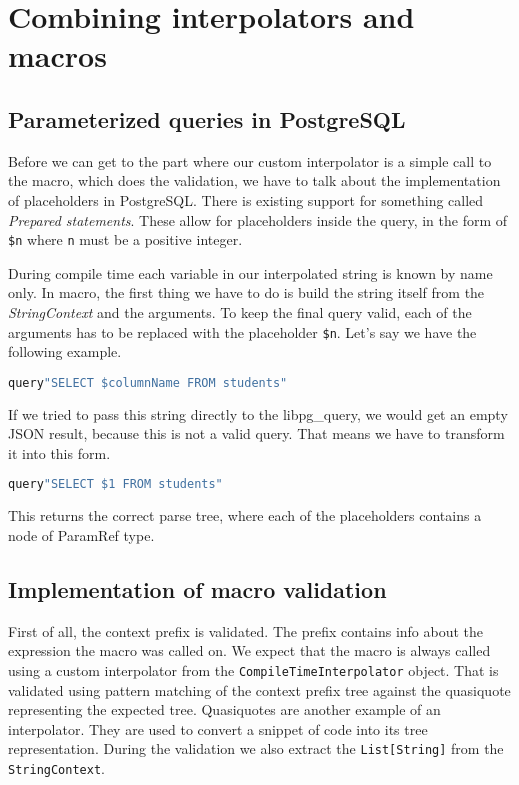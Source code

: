 \section{Combining interpolators and macros}
\subsection{Parameterized queries in PostgreSQL}
Before we can get to the part where our custom interpolator is a simple call to the macro, which does the validation, we have to talk about the implementation of placeholders in PostgreSQL. There is existing support for something called \textit{Prepared statements}. These allow for placeholders inside the query, in the form of \texttt{\$n} where \texttt{n} must be a positive integer.  

During compile time each variable in our interpolated string is known by name only. In macro, the first thing we have to do is build the string itself from the \textit{StringContext} and the arguments. To keep the final query valid, each of the arguments has to be replaced with the placeholder \texttt{\$n}. 
Let's say we have the following example.
\begin{lstlisting}[language=scala, basicstyle=\ttfamily, showstringspaces=false]
query"SELECT $columnName FROM students"
\end{lstlisting}
If we tried to pass this string directly to the libpg\_query, we would get an empty JSON result, because this is not a valid query. That means we have to transform it into this form.
\begin{lstlisting}[language=scala, basicstyle=\ttfamily, showstringspaces=false]
query"SELECT $1 FROM students"
\end{lstlisting}
This returns the correct parse tree, where each of the placeholders contains a node of ParamRef type. 

\subsection{Implementation of macro validation}
First of all, the context prefix is validated. The prefix contains info about the expression the macro was called on. We expect that the macro is always called using a custom interpolator from the \texttt{CompileTimeInterpolator} object. That is validated using pattern matching of the context prefix tree against the quasiquote representing the expected tree. Quasiquotes are another example of an interpolator. They are used to convert a snippet of code into its tree representation.\cite{quasiquotes} During the validation we also extract the \texttt{List[String]} from the \texttt{StringContext}.

